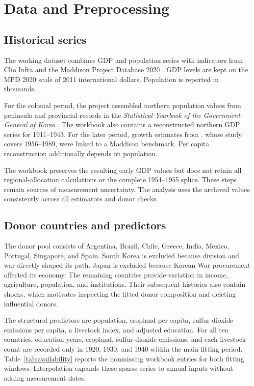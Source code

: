 \documentclass[12pt]{article}
\begin{document}
\section{Data and Preprocessing}

\subsection{Historical series}
The working dataset combines GDP and population series with indicators from Clio Infra \citep{clioinfra2010} and the Maddison Project Database 2020 \citep{bolt2020maddison}. GDP levels are kept on the MPD 2020 scale of 2011 international dollars. Population is reported in thousands.

For the colonial period, the project assembled northern population values from peninsula and provincial records in the \textit{Statistical Yearbook of the Government-General of Korea} \citep{govgeneral1943}. The workbook also contains a reconstructed northern GDP series for 1911--1943. For the later period, growth estimates from \citet{chokim2020growth}, whose study covers 1956--1989, were linked to a Maddison benchmark. Per capita reconstruction additionally depends on population.

The workbook preserves the resulting early GDP values but does not retain all regional-allocation calculations or the complete 1954--1955 splice. These steps remain sources of measurement uncertainty. The analysis uses the archived values consistently across all estimators and donor checks.

\subsection{Donor countries and predictors}
The donor pool consists of Argentina, Brazil, Chile, Greece, India, Mexico, Portugal, Singapore, and Spain. South Korea is excluded because division and war directly shaped its path. Japan is excluded because Korean War procurement affected its economy. The remaining countries provide variation in income, agriculture, population, and institutions. Their subsequent histories also contain shocks, which motivates inspecting the fitted donor composition and deleting influential donors.

The structural predictors are population, cropland per capita, sulfur-dioxide emissions per capita, a livestock index, and adjusted education. For all ten countries, education years, cropland, sulfur-dioxide emissions, and each livestock count are recorded only in 1920, 1930, and 1940 within the main fitting period. Table~\ref{tab:availability} reports the nonmissing workbook entries for both fitting windows. Interpolation expands these sparse series to annual inputs without adding measurement dates.
\end{document}
